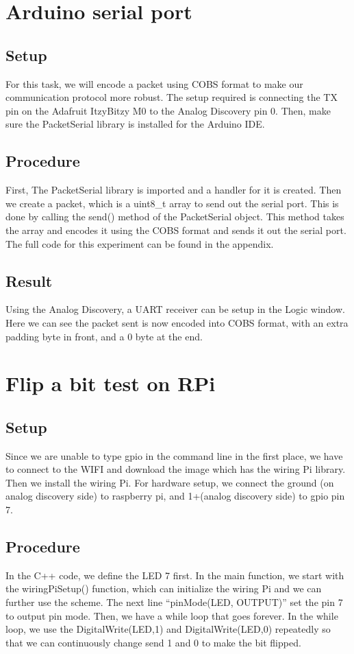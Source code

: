 \documentclass{article}
\begin{document}
	\section{Arduino serial port}
	\subsection{Setup}
	For this task, we will encode a packet using COBS format to make our communication protocol more robust. The setup required is connecting the TX pin on the Adafruit ItzyBitzy M0 to the Analog Discovery pin 0. Then, make sure the PacketSerial library is installed for the Arduino IDE.
	
	\subsection{Procedure}
	First, The PacketSerial library is imported and a handler for it is created. Then we create a packet, which is a uint8\_t array to send out the serial port. This is done by calling the send() method of the PacketSerial object. This method takes the array and encodes it using the COBS format and sends it out the serial port. The full code for this experiment can be found in the appendix.
	
	\subsection{Result}
	Using the Analog Discovery, a UART receiver can be setup in the Logic window. Here we can see the packet sent is now encoded into COBS format, with an extra padding byte in front, and a 0 byte at the end.
	
	\clearpage
	\section{Flip a bit test on RPi}
	\subsection{Setup}
	Since we are unable to type gpio in the command line in the first place, we have to connect to the WIFI and download the image which has the wiring Pi library. Then we install the wiring Pi. For hardware setup, we connect the ground (on analog discovery side) to raspberry pi, and 1+(analog discovery side) to gpio pin 7.
	\subsection{Procedure}
	In the C++ code, we define the LED 7 first. In the main function, we start with the wiringPiSetup() function, which can initialize the wiring Pi and we can further use the scheme. The next line “pinMode(LED, OUTPUT)” set the pin 7 to output pin mode. Then, we have a while loop that goes forever. In the while loop, we use the DigitalWrite(LED,1) and DigitalWrite(LED,0) repeatedly so that we can continuously change send 1 and 0 to make the bit flipped. 
\end{document}
